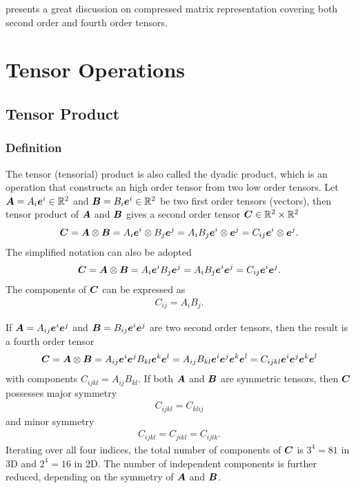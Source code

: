 \cite{Helnwein2001} presents a great discussion on compressed matrix representation covering both second order and fourth order tensors.
\section{Tensor Operations}
\subsection{Tensor Product}
\subsubsection{Definition}
The tensor (tensorial) product is also called the dyadic product, which is an operation that constructs an high order tensor from two low order tensors. Let $\bm{A}=A_i\bm{e}^i\in\mathbb{R}^2$ and $\bm{B}=B_i\bm{e}^i\in\mathbb{R}^2$ be two first order tensors (vectors), then tensor product of $\bm{A}$ and $\bm{B}$ gives a second order tensor $\bm{C}\in\mathbb{R}^2\times\mathbb{R}^2$
\begin{gather}
\bm{C}=\bm{A}\otimes\bm{B}=A_i\bm{e}^i\otimes{}B_j\bm{e}^j=A_iB_j\bm{e}^i\otimes{}\bm{e}^j=C_{ij}\bm{e}^i\otimes{}\bm{e}^j.
\end{gather}
The simplified notation can also be adopted
\begin{gather}\label{eq:1st_tensor_product}
\bm{C}=\bm{A}\otimes\bm{B}=A_i\bm{e}^iB_j\bm{e}^j=A_iB_j\bm{e}^i\bm{e}^j=C_{ij}\bm{e}^i\bm{e}^j.
\end{gather}
The components of $\bm{C}$ can be expressed as
\begin{gather}
C_{ij}=A_{i}B_{j}.
\end{gather}

If $\bm{A}=A_{ij}\bm{e}^i\bm{e}^j$ and $\bm{B}=B_{ij}\bm{e}^i\bm{e}^j$ are two second order tensors, then the result is a fourth order tensor
\begin{gather}\label{eq:2nd_tensor_product}
\bm{C}=\bm{A}\otimes\bm{B}=A_{ij}\bm{e}^i\bm{e}^jB_{kl}\bm{e}^k\bm{e}^l=A_{ij}B_{kl}\bm{e}^i\bm{e}^j\bm{e}^k\bm{e}^l=C_{ijkl}\bm{e}^i\bm{e}^j\bm{e}^k\bm{e}^l
\end{gather}
with components $C_{ijkl}=A_{ij}B_{kl}$. If both $\bm{A}$ and $\bm{B}$ are symmetric tensors, then $\bm{C}$ possesses major symmetry
\begin{gather}
C_{ijkl}=C_{klij}
\end{gather}
and minor symmetry
\begin{gather}
C_{ijkl}=C_{jikl}=C_{ijlk}.
\end{gather}
Iterating over all four indices, the total number of components of $\bm{C}$ is $3^4=81$ in 3D and $2^4=16$ in 2D.
The number of independent components is further reduced, depending on the symmetry of $\bm{A}$ and $\bm{B}$.
